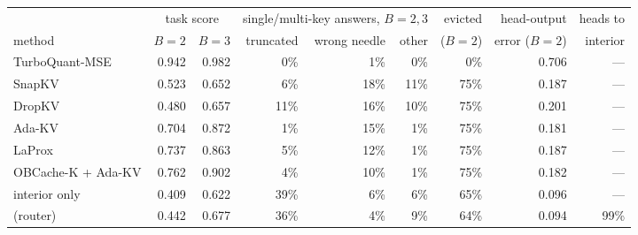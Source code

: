 \begin{tabular}{@{}lrrrrrrrr@{}}
\toprule
 & \multicolumn{2}{c}{task score} & \multicolumn{3}{c}{single/multi-key answers, $B{=}2,3$} & evicted & head-output & heads to \\
\cmidrule(lr){2-3}\cmidrule(lr){4-6}
method & $B{=}2$ & $B{=}3$ & truncated & wrong needle & other & ($B{=}2$) & error ($B{=}2$) & interior \\
\midrule
TurboQuant-MSE & 0.942 & 0.982 & 0\% & 1\% & 0\% & 0\% & 0.706 & --- \\
SnapKV & 0.523 & 0.652 & 6\% & 18\% & 11\% & 75\% & 0.187 & --- \\
DropKV & 0.480 & 0.657 & 11\% & 16\% & 10\% & 75\% & 0.201 & --- \\
Ada-KV & 0.704 & 0.872 & 1\% & 15\% & 1\% & 75\% & 0.181 & --- \\
LaProx & 0.737 & 0.863 & 5\% & 12\% & 1\% & 75\% & 0.187 & --- \\
OBCache-K + Ada-KV & 0.762 & 0.902 & 4\% & 10\% & 1\% & 75\% & 0.182 & --- \\
\sieve{} interior only & 0.409 & 0.622 & 39\% & 6\% & 6\% & 65\% & 0.096 & --- \\
\sieve{} (router) & 0.442 & 0.677 & 36\% & 4\% & 9\% & 64\% & 0.094 & 99\% \\
\bottomrule
\end{tabular}
